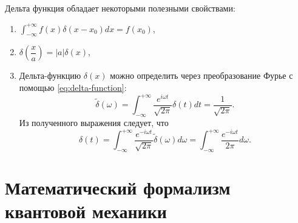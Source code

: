 \documentclass[11pt]{article}
\begin{document}
Дельта функция обладает некоторыми полезными свойствами:
\begin{enumerate}
\item $\int _{-\infty}^{+\infty} f(x)\delta(x - x_0)dx = f(x_0)$,
\item $\delta\left(\dfrac{x}{a}\right) = |a|\delta(x)$,
\item Дельта-функцию $\delta(x)$ можно определить через преобразование Фурье с помощью \eqref{eq:delta-function}:
\[
\tilde{\delta}(\omega) = \int_{-\infty}^{+\infty}\dfrac{e^{i\omega t}}{\sqrt{2\pi}}\delta(t)dt = \dfrac{1}{\sqrt{2\pi}}.
\]
Из полученного выражения следует, что 
\[
\delta(t) = \int_{-\infty}^{+\infty}\dfrac{e^{-i\omega t}}{\sqrt{2\pi}}\tilde{\delta}(\omega)d\omega = \int_{-\infty}^{+\infty}\dfrac{e^{-i\omega t}}{2\pi}d\omega.
\]
\end{enumerate}


\section{Математический формализм квантовой механики}
\end{document}
